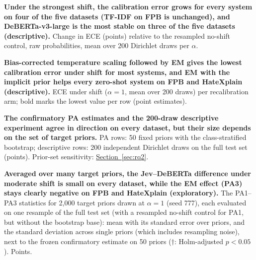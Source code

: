 \begin{table}[htbp]
  \centering
  \caption{\textbf{Under the strongest shift, the calibration error grows for every system on four of the five
  datasets (TF-IDF on FPB is unchanged), and DeBERTa-v3-large is the most stable on three of the five datasets
  (descriptive).} Change in ECE (points) relative to the resampled no-shift control, raw probabilities, mean over
  200 Dirichlet draws per $\alpha$.}
  \label{tab:exp2delta}
  \scriptsize
  \setlength{\tabcolsep}{3pt}
  
\end{table}

\begin{table}[htbp]
  \centering
  \caption{\textbf{Bias-corrected temperature scaling followed by EM gives the lowest calibration error under shift for
  most systems, and EM with the implicit prior helps every zero-shot system on FPB and HateXplain (descriptive).} ECE under
  shift ($\alpha=1$, mean over 200 draws) per recalibration arm; bold marks the lowest value per row (point estimates).}
  \label{tab:exp2arms}
  \scriptsize
  
\end{table}

\begin{table}[htbp]
  \centering
  \caption{\textbf{The confirmatory PA estimates and the 200-draw descriptive experiment agree in direction on every
  dataset, but their size depends on the set of target priors.} PA rows: 50 fixed priors with the class-stratified
  bootstrap; descriptive rows: 200 independent Dirichlet draws on the full test set (points). Prior-set sensitivity:
  \hyperref[sec:rq2]{Section~\ref*{sec:rq2}}.}
  \label{tab:pavsexp2}
  \scriptsize
  
\end{table}

\begin{table}[htbp]
  \centering
  \caption{\textbf{Averaged over many target priors, the Jev--DeBERTa difference under moderate shift is small on every
  dataset, while the EM effect (PA3) stays clearly negative on FPB and HateXplain (exploratory).} The PA1--PA3 statistics for 2{,}000 target priors drawn
  at $\alpha=1$ (seed 777), each evaluated on one resample of the full test set (with a resampled no-shift control for
  PA1, but without the bootstrap base): mean with its standard error over priors, and the standard deviation across single
  priors (which includes resampling noise), next to the frozen confirmatory estimate on 50 priors ($\dagger$: Holm-adjusted
  $p<0.05$). Points.}
  \label{tab:papop}
  \scriptsize
  
\end{table}

